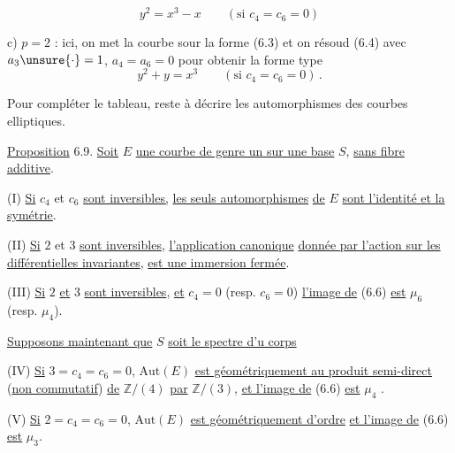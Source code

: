 %
%
\[
y^2=x^3-x \qquad (\text{si }c_4=c_6=0) \tag*{(6.7)}
\]

c) $p=2$ : ici, on met la courbe sour la forme (6.3) et on résoud (6.4) avec $a_3\unsure{\cdot}=1$, $a_4=a_6=0$ pour obtenir la forme type
\[
y^2+y=x^3 \qquad (\text{si }c_4=c_6=0) \, . \tag*{(6.8)}
\]

Pour compléter le tableau, reste à décrire les automorphismes des courbes elliptiques.

\uline{Proposition} 6.9. \quad \uline{Soit} $E$ \uline{une courbe de genre un sur une base} $S$, \uline{sans fibre additive}.

(I) \quad \uline{Si} $c_4$ et $c_6$ \uline{sont inversibles,} \uline{les seuls automorphismes} \uline{de} $E$ \uline{sont l'identité et la symétrie}.

(II) \quad \uline{Si} $2$ et $3$ \uline{sont inversibles}, \uline{l'application canonique}
\uline{donnée par l'action sur les différentielles invariantes}, \uline{est une immersion fermée}.

(III) \uline{Si} $2$ \uline{et} $3$ \uline{sont inversibles}, \uline{et} $c_4=0$ (resp. $c_6=0$) \uline{l'image de} (6.6) \uline{est} $\mu_6$ (resp. $\mu_4$).

\uline{Supposons maintenant que} $S$ \uline{soit le spectre d'u corps}

(IV) \quad \uline{Si} $3=c_4=c_6=0$, $\mathrm{Aut}(E)$ \uline{est géométriquement  au produit semi-direct} (\uline{non commutatif}) \uline{de} $\mathbb{Z}/(4)$ \uline{par} $\mathbb{Z}/(3)$, \uline{et l'image de} (6.6) \uline{est} $\mu_4$ .

(V) \quad \uline{Si} $2=c_4=c_6=0$, $\mathrm{Aut}(E)$ \uline{est géométriquement d'ordre}  \uline{et l'image de} (6.6) \uline{est} $\mu_3$.

